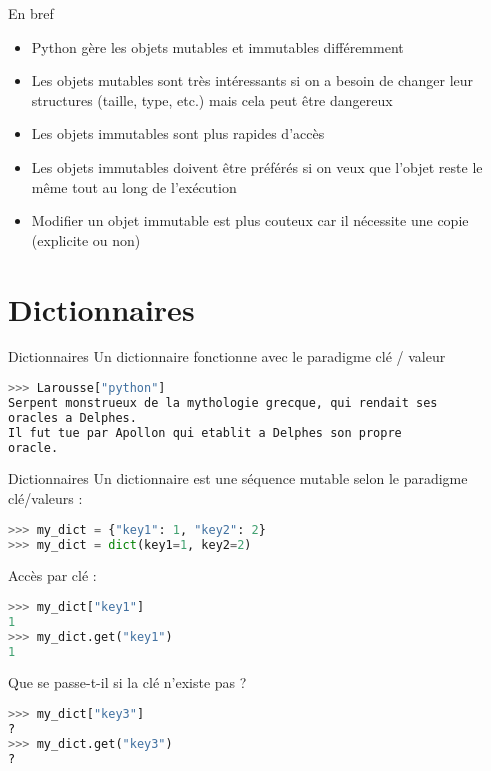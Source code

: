 \begin{frame}{En bref}
  \begin{block}{}
    \medskip
    \begin{itemize}
      \item Python gère les objets mutables et immutables différemment
      \item Les objets mutables sont très intéressants si on a besoin de changer leur structures (taille, type, etc.) mais cela peut être dangereux
      \item Les objets immutables sont plus rapides d'accès
      \item Les objets immutables doivent être préférés si on veux que l'objet reste le même tout au long de l'exécution
      \item Modifier un objet immutable est plus couteux car il nécessite une copie (explicite ou non)
    \end{itemize}
  \end{block}
\end{frame}





\section{Dictionnaires}

\begin{frame}[fragile]{Dictionnaires}
  Un dictionnaire fonctionne avec le paradigme clé / valeur

\begin{lstlisting}[language=Python, numbers=none]
>>> Larousse["python"]
Serpent monstrueux de la mythologie grecque, qui rendait ses 
oracles a Delphes.
Il fut tue par Apollon qui etablit a Delphes son propre 
oracle.
\end{lstlisting}

\end{frame}

\begin{frame}[fragile]{Dictionnaires}
  Un dictionnaire est une séquence mutable selon le paradigme clé/valeurs :
\begin{lstlisting}[language=Python, morekeywords={True, false}, numbers=none]
>>> my_dict = {"key1": 1, "key2": 2}
>>> my_dict = dict(key1=1, key2=2)
\end{lstlisting}
  
  Accès par clé :
\begin{lstlisting}[language=Python, morekeywords={True, false}, numbers=none]
>>> my_dict["key1"]
1
>>> my_dict.get("key1")
1
\end{lstlisting}

Que se passe-t-il si la clé n'existe pas ?
\begin{lstlisting}[language=Python, morekeywords={True, false}, numbers=none]
>>> my_dict["key3"]
?
>>> my_dict.get("key3")
?
\end{lstlisting}
  
\end{frame}




